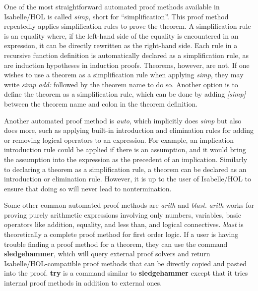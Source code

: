 \documentclass{article}
\begin{document}
One of the most straightforward automated proof methods available in 
Isabelle/HOL is called \textit{simp}, short for ``simplification''. This proof 
method repeatedly applies simplification rules to prove the theorem. A 
simplification rule is an equality where, if the left-hand side of the equality 
is encountered in an expression, it can be directly rewritten as the right-hand 
side. Each rule in a recursive function definition is automatically declared as 
a simplification rule, as are induction hypotheses in induction proofs. 
Theorems, however, are not. If one wishes to use a theorem as a simplification 
rule when applying \textit{simp}, they may write \textit{simp add:} followed by 
the theorem name to do so. Another option is to define the theorem as a 
simplification rule, which can be done by adding \textit{[simp]} between the 
theorem name and colon in the theorem definition.

Another automated proof method is \textit{auto}, which implicitly does
\textit{simp} but also does more, such as applying built-in introduction and 
elimination rules for adding or removing logical operators to an expression. 
For example, an implication introduction rule could be applied if there is an 
assumption, and it would bring the assumption into the expression as the 
precedent of an implication. Similarly to declaring a theorem as a 
simplification rule, a theorem can be declared as an introduction or 
elimination rule. However, it is up to the user of Isabelle/HOL to ensure that 
doing so will never lead to nontermination.

Some other common automated proof methods are \textit{arith} and 
\textit{blast}. \textit{arith} works for proving purely arithmetic expressions 
involving only numbers, variables, basic operators like addition, equality, and 
less than, and logical connectives. \textit{blast} is theoretically a complete 
proof method for first order logic. If a user is having trouble finding a proof 
method for a theorem, they can use the command \textbf{sledgehammer}, which 
will query external proof solvers and return Isabelle/HOL-compatible proof 
methods that can be directly copied and pasted into the proof. \textbf{try} is 
a command similar to \textbf{sledgehammer} except that it tries internal proof 
methods in addition to external ones.

\newpage

\nocite{*}




\end{document}

